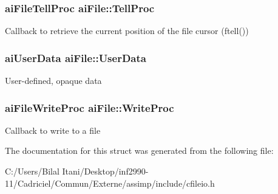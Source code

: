 \subsubsection[{\texorpdfstring{Tell\+Proc}{TellProc}}]{\setlength{\rightskip}{0pt plus 5cm}ai\+File\+Tell\+Proc ai\+File\+::\+Tell\+Proc}\hypertarget{structai_file_aaf2d88a3b2fcbdacf51119658283d27e}{}\label{structai_file_aaf2d88a3b2fcbdacf51119658283d27e}
Callback to retrieve the current position of the file cursor (ftell()) 
\subsubsection[{\texorpdfstring{User\+Data}{UserData}}]{\setlength{\rightskip}{0pt plus 5cm}ai\+User\+Data ai\+File\+::\+User\+Data}\hypertarget{structai_file_aec528fa18f4755fe4f28d604fde28aad}{}\label{structai_file_aec528fa18f4755fe4f28d604fde28aad}
User-\/defined, opaque data 
\subsubsection[{\texorpdfstring{Write\+Proc}{WriteProc}}]{\setlength{\rightskip}{0pt plus 5cm}ai\+File\+Write\+Proc ai\+File\+::\+Write\+Proc}\hypertarget{structai_file_ab9fca3a62e34a33592c13a6f31db7d1d}{}\label{structai_file_ab9fca3a62e34a33592c13a6f31db7d1d}
Callback to write to a file 

The documentation for this struct was generated from the following file\+:\begin{DoxyCompactItemize}
\item 
C\+:/\+Users/\+Bilal Itani/\+Desktop/inf2990-\/11/\+Cadriciel/\+Commun/\+Externe/assimp/include/cfileio.\+h\end{DoxyCompactItemize}
